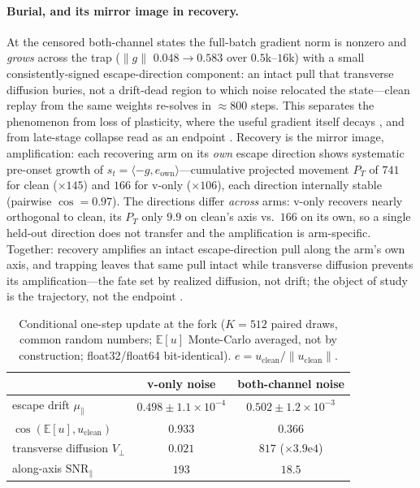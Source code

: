 \documentclass[10pt]{article}
\begin{document}
\paragraph{Burial, and its mirror image in recovery.}
At the censored both-channel states the full-batch gradient norm is nonzero and
\emph{grows} across the trap ($\|g\|$ $0.048\!\to\!0.583$ over $0.5$k--$16$k) with
a small consistently-signed escape-direction component: an intact pull that
transverse diffusion buries, not a drift-dead region to which noise relocated the
state---clean replay from the same weights re-solves in ${\approx}800$ steps. This
separates the phenomenon from loss of plasticity, where the useful gradient itself
decays \citep{dohare}, and from late-stage collapse read as an endpoint
\citep{antigrok}. Recovery is the mirror image, amplification: each recovering arm
on its \emph{own} escape direction shows systematic pre-onset growth of
$s_t=\langle-g,e_{\mathrm{own}}\rangle$---cumulative projected movement $P_T$ of
$741$ for clean ($\times145$) and $166$ for v-only ($\times106$), each direction
internally stable (pairwise $\cos=0.97$). The directions differ \emph{across} arms:
v-only recovers nearly orthogonal to clean, its $P_T$ only $9.9$ on clean's axis
vs.\ $166$ on its own, so a single held-out direction does not transfer and the
amplification is arm-specific. Together: recovery amplifies an intact
escape-direction pull along the arm's own axis, and trapping leaves that same pull
intact while transverse diffusion prevents its amplification---the fate set by
realized diffusion, not drift; the object of study is the trajectory, not the
endpoint \citep{position}.

\begin{table}[t]
\centering\small
\caption{Conditional one-step update at the fork ($K{=}512$ paired draws, common
random numbers; $\mathbb{E}[u]$ Monte-Carlo averaged, not by construction;
float32/float64 bit-identical). $e=u_{\mathrm{clean}}/\|u_{\mathrm{clean}}\|$.}
\label{tab:drift}
\begin{tabular}{lcc}
\toprule
 & v-only noise & both-channel noise \\
\midrule
escape drift $\mu_\parallel$ & $0.498\pm1.1{\times}10^{-4}$ & $0.502\pm1.2{\times}10^{-3}$ \\
$\cos(\mathbb{E}[u],u_{\mathrm{clean}})$ & $0.933$ & $0.366$ \\
transverse diffusion $V_\perp$ & $0.021$ & $817$ \;($\times3.9\mathrm{e}4$) \\
along-axis $\mathrm{SNR}_\parallel$ & $193$ & $18.5$ \\
\bottomrule
\end{tabular}
\end{table}
\end{document}
